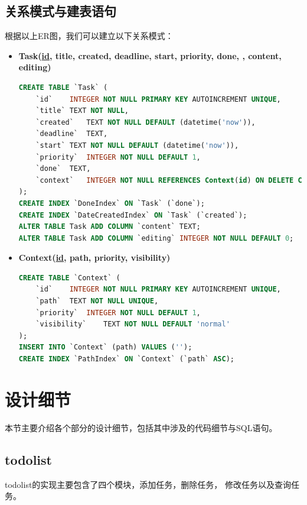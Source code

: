 \documentclass[a4paper, 11pt]{article}
\begin{document}
\subsection{关系模式与建表语句}
\par 根据以上ER图，我们可以建立以下关系模式：
\begin{itemize}
\item \textbf{Task(\uline{id}, title, created, deadline, start, priority, done, , content, editing)}
\begin{lstlisting}[language=SQL]
CREATE TABLE `Task` (
	`id`	INTEGER NOT NULL PRIMARY KEY AUTOINCREMENT UNIQUE,
	`title`	TEXT NOT NULL,
	`created`	TEXT NOT NULL DEFAULT (datetime('now')),
	`deadline`	TEXT,
	`start`	TEXT NOT NULL DEFAULT (datetime('now')),
	`priority`	INTEGER NOT NULL DEFAULT 1,
	`done`	TEXT,
	`context`	INTEGER NOT NULL REFERENCES Context(id) ON DELETE CASCADE
);
CREATE INDEX `DoneIndex` ON `Task` (`done`);
CREATE INDEX `DateCreatedIndex` ON `Task` (`created`);
ALTER TABLE Task ADD COLUMN `content` TEXT;
ALTER TABLE Task ADD COLUMN `editing` INTEGER NOT NULL DEFAULT 0;
\end{lstlisting}
\item \textbf{Context(\uline{id}, path, priority, visibility)}
\begin{lstlisting}[language=SQL]
CREATE TABLE `Context` (
	`id`	INTEGER NOT NULL PRIMARY KEY AUTOINCREMENT UNIQUE,
	`path`	TEXT NOT NULL UNIQUE,
	`priority`	INTEGER NOT NULL DEFAULT 1,
	`visibility`	TEXT NOT NULL DEFAULT 'normal'
);
INSERT INTO `Context` (path) VALUES ('');
CREATE INDEX `PathIndex` ON `Context` (`path` ASC);
\end{lstlisting}
\end{itemize}

\section{设计细节}
\par 本节主要介绍各个部分的设计细节，包括其中涉及的代码细节与SQL语句。

\subsection{todolist}
todolist的实现主要包含了四个模块，添加任务，删除任务， 修改任务以及查询任务。
\end{document}
